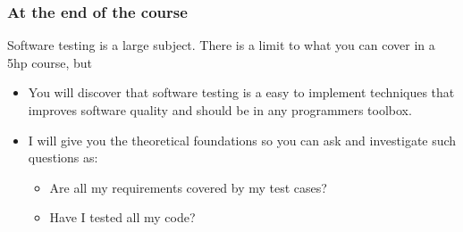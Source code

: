 \documentclass{beamer}
\begin{document}
\begin{frame}
  \frametitle{At the end of the course}
  Software testing is a large subject. There is a limit to what you
  can cover in a 5hp course, but 
  \begin{itemize}
  \item You will discover that software testing is a easy to implement
    techniques that improves software quality and should be in any
    programmers toolbox.
  \item I will give you the theoretical foundations so you can ask
    and investigate such questions as:
    \begin{itemize}
    \item Are all my requirements covered by my test cases?
    \item Have I tested all my code?
    \end{itemize}
  \end{itemize}
\end{frame}
%
\end{document}
